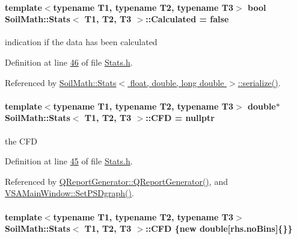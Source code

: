 \hypertarget{class_soil_math_1_1_stats_a3d3cd491b829b2e30f6752fee38fe261}{}
\paragraph[{Calculated}]{\setlength{\rightskip}{0pt plus 5cm}template$<$typename T1, typename T2, typename T3$>$ bool {\bf Soil\+Math\+::\+Stats}$<$ T1, T2, T3 $>$\+::Calculated = false}\label{class_soil_math_1_1_stats_a3d3cd491b829b2e30f6752fee38fe261}
indication if the data has been calculated 

Definition at line \hyperlink{_stats_8h_source_l00046}{46} of file \hyperlink{_stats_8h_source}{Stats.\+h}.



Referenced by \hyperlink{_stats_8h_source_l00651}{Soil\+Math\+::\+Stats$<$ float, double, long double $>$\+::serialize()}.

\hypertarget{class_soil_math_1_1_stats_a0d68c6fb52cb445c413aa187038bb1fe}{}
\paragraph[{C\+F\+D}]{\setlength{\rightskip}{0pt plus 5cm}template$<$typename T1, typename T2, typename T3$>$ double$\ast$ {\bf Soil\+Math\+::\+Stats}$<$ T1, T2, T3 $>$\+::C\+F\+D = nullptr}\label{class_soil_math_1_1_stats_a0d68c6fb52cb445c413aa187038bb1fe}
the C\+F\+D 

Definition at line \hyperlink{_stats_8h_source_l00045}{45} of file \hyperlink{_stats_8h_source}{Stats.\+h}.



Referenced by \hyperlink{qreportgenerator_8cpp_source_l00004}{Q\+Report\+Generator\+::\+Q\+Report\+Generator()}, and \hyperlink{vsamainwindow_8cpp_source_l00285}{V\+S\+A\+Main\+Window\+::\+Set\+P\+S\+Dgraph()}.

\hypertarget{class_soil_math_1_1_stats_a4c462b7b476263abc57d3f1faba1b2da}{}
\paragraph[{C\+F\+D}]{\setlength{\rightskip}{0pt plus 5cm}template$<$typename T1, typename T2, typename T3$>$ {\bf Soil\+Math\+::\+Stats}$<$ T1, T2, T3 $>$\+::C\+F\+D \{new double\mbox{[}rhs.\+no\+Bins\mbox{]}\{\}\}}\label{class_soil_math_1_1_stats_a4c462b7b476263abc57d3f1faba1b2da}


